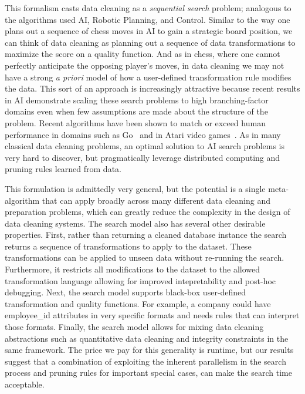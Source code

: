 This formalism casts data cleaning as a \emph{sequential search} problem; analogous to the algorithms used AI, Robotic Planning, and Control.
Similar to the way one plans out a sequence of chess moves in AI to gain a strategic board position, we can think of data cleaning as planning out a sequence of data transformations to maximize the score on a quality function.
And as in chess, where one cannot perfectly anticipate the opposing player's moves, in data cleaning we may not have a strong \emph{a priori} model of how a user-defined transformation rule modifies the data.
This sort of an approach is increasingly attractive because recent results in AI demonstrate scaling these search problems to  high branching-factor domains even when few assumptions are made about the structure of the problem.
Recent algorithms have been shown to match or exceed human performance in domains such as Go~\cite{silver2016mastering} and in Atari video games~\cite{mnih2015human}.
As in many classical data cleaning problems, an optimal solution to AI search problems is very hard to discover, but pragmatically leverage distributed computing and pruning rules learned from data.

This formulation is admittedly very general, but the potential is a single meta-algorithm that can apply broadly across many different data cleaning and preparation problems, which can greatly reduce the complexity in the design of data cleaning systems.
The search model also has several other desirable properties. First, rather than returning a cleaned database instance the search returns a sequence of transformations to apply to the dataset. 
These transformations can be applied to unseen data without re-running the search. 
Furthermore, it restricts all modifications to the dataset to the allowed transformation language allowing for improved intepretability and post-hoc debugging.
Next, the search model supports black-box user-defined transformation and quality functions. 
For example, a company could have \textsf{employee\_id} attributes in very specific formats and needs rules that can interpret those formats.
Finally, the search model allows for mixing data cleaning abstractions such as quantitative data cleaning and integrity constraints in the same framework.
The price we pay for this generality is runtime, but our results suggest that a combination of exploiting the inherent parallelism in the search process and pruning rules for important special cases, can make the search time acceptable.

